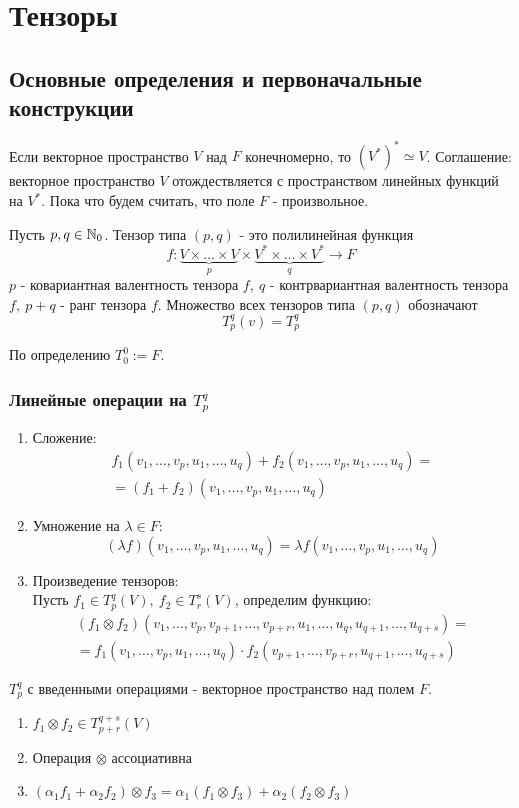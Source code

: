 \section{Тензоры}
\subsection{Основные определения и первоначальные конструкции}
Если векторное пространство $V$ над $F$ конечномерно, то $(V^*)^*\simeq V$. Соглашение: векторное пространство $V$ отождествляется с пространством линейных функций на $V^*$.
Пока что будем считать, что поле $F$ - произвольное.
\begin{definition}
    Пусть $p,q\in \mathbb{N}_0$. Тензор типа $(p,q)$ - это полилинейная функция 
    \[f: \underbrace{V\times \dots\times V}_p \times \underbrace{V^*\times \dots\times V^*}_q \to F\]
    $p$ - ковариантная валентность тензора $f,\ q$ - контрвариантная валентность тензора $f,\ p+q$ - ранг тензора $f$. 
    Множество всех тензоров типа $(p,q)$ обозначают 
    \[T^q_p(v)=T^q_p\]
\end{definition} 
По определению $T_0^0 := F$.
\subsubsection*{Линейные операции на $T^q_p$}
\begin{enumerate}
    \item Сложение: 
    \begin{multline*}
        f_1(v_1,\dots,v_p,u_1,\dots,u_q)+f_2(v_1,\dots,v_p,u_1,\dots,u_q)=\\
        =(f_1+f_2)(v_1,\dots,v_p,u_1,\dots,u_q)
    \end{multline*}
    \item Умножение на $\lambda\in F$:
    \[(\lambda f)(v_1,\dots,v_p,u_1,\dots,u_q)=\lambda f(v_1,\dots,v_p,u_1,\dots,u_q)\] 
    \item Произведение тензоров:\\
    Пусть $f_1\in T_p^q(V),\ f_2\in T_r^s(V)$, определим функцию:
    \begin{multline*}
        (f_1\otimes f_2)(v_1,\dots,v_p,v_{p+1},\dots,v_{p+r},u_1,\dots,u_q,u_{q+1},\dots,u_{q+s})=\\
        =f_1(v_1,\dots,v_p,u_1,\dots,u_q)\cdot f_2(v_{p+1},\dots,v_{p+r},u_{q+1},\dots,u_{q+s})
    \end{multline*}
\end{enumerate}
\begin{subtheorem}
    $T_p^q$ с введенными операциями - векторное пространство над полем $F$.
\end{subtheorem}
\begin{subtheorem}\tab
    \begin{enumerate}
        \item $f_1\otimes f_2\in T_{p+r}^{q+s}(V)$
        \item Операция $\otimes$ ассоциативна
        \item $(\alpha_1f_1+\alpha_2f_2)\otimes f_3=\alpha_1(f_1\otimes f_3)+\alpha_2(f_2\otimes f_3)$ %
    \end{enumerate}
\end{subtheorem}
